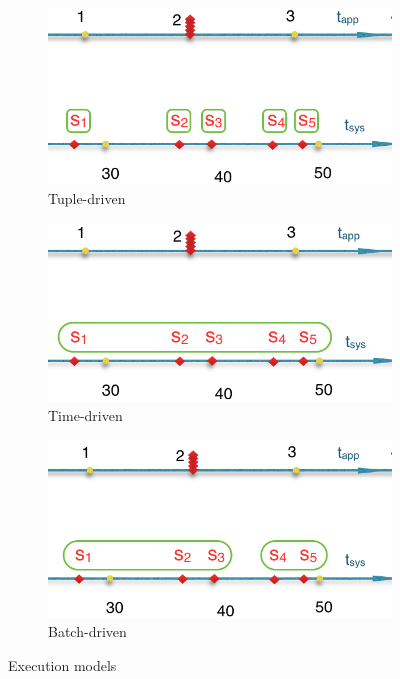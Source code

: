 \begin{itemize}
\begin{figure}[htbp!] 
  \centering
  \begin{subfigure}[b]{0.3\textwidth}
    \includegraphics[width=\textwidth]{executionModel_a}
    \caption{Tuple-driven}
    \label{fig:TomJerry}   
  \end{subfigure}             
  \begin{subfigure}[b]{0.3\textwidth}
    \includegraphics[width=\textwidth]{executionModel_b}
    \caption{Time-driven}
    \label{fig:WallE}
  \end{subfigure}             
  \begin{subfigure}[b]{0.3\textwidth}
    \includegraphics[width=\textwidth]{executionModel_c}
    \caption{Batch-driven}
    \label{fig:Minnion}
  \end{subfigure}
  \caption{Execution models}
  \label{fig:executionModel}
\end{figure}

\end{itemize}
